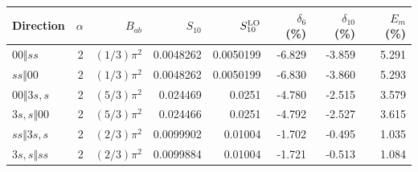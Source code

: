 \begin{tabular}{lrrrrrrr}\toprule
Direction & $\alpha$ & $B_{ab}$ & $S_{10}$ & $S_{10}^{\rm LO}$ & $\delta_6$ (\%) & $\delta_{10}$ (\%) & $E_m$ (\%)\\\midrule
$00\Vert ss$ & 2 & $(1/3)\pi^{2}$ & 0.0048262 & 0.0050199 & -6.829 & -3.859 & 5.291\\
$ss\Vert 00$ & 2 & $(1/3)\pi^{2}$ & 0.0048262 & 0.0050199 & -6.830 & -3.860 & 5.293\\
$00\Vert 3s,s$ & 2 & $(5/3)\pi^{2}$ & 0.024469 & 0.0251 & -4.780 & -2.515 & 3.579\\
$3s,s\Vert 00$ & 2 & $(5/3)\pi^{2}$ & 0.024466 & 0.0251 & -4.792 & -2.527 & 3.615\\
$ss\Vert 3s,s$ & 2 & $(2/3)\pi^{2}$ & 0.0099902 & 0.01004 & -1.702 & -0.495 & 1.035\\
$3s,s\Vert ss$ & 2 & $(2/3)\pi^{2}$ & 0.0099884 & 0.01004 & -1.721 & -0.513 & 1.084\\
\bottomrule\end{tabular}
